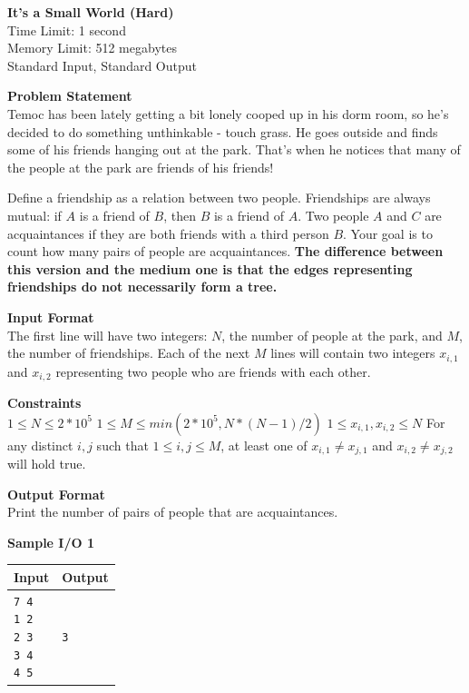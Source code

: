 \documentclass{article}
\begin{document}
\begin{center}
{\LARGE \bf It's a Small World (Hard)}\\
{\large Time Limit: 1 second}\\
{\large Memory Limit: 512 megabytes}\\
Standard Input, Standard Output
\end{center}

{\noindent \bf Problem Statement}\\
Temoc has been lately getting a bit lonely cooped up in his dorm room, so he's decided to do something unthinkable - touch grass. He goes outside and finds some of his friends hanging out at the park. That's when he notices that many of the people at the park are friends of his friends! \newline

\noindent Define a friendship as a relation between two people. Friendships are always mutual: if $A$ is a friend of $B$, then $B$ is a friend of $A$. Two people $A$ and $C$ are acquaintances if they are both friends with a third person $B$. Your goal is to count how many pairs of people are acquaintances. \textbf{The difference between this version and the medium one is that the edges representing friendships do not necessarily form a tree.} \newline

{\noindent \bf Input Format}\\
The first line will have two integers: $N$, the number of people at the park, and $M$, the number of friendships. Each of the next $M$ lines will contain two integers $x_{i,1}$ and $x_{i,2}$ representing two people who are friends with each other. \newline

{\noindent \bf Constraints}\\
$1 \leq N \leq 2 * 10^5$ \newline
$1 \leq M \leq min(2*10^5, N*(N - 1)/2)$ \newline
$1 \leq x_{i,1},x_{i,2} \leq N$ \newline
For any distinct $i,j$ such that $1 \leq i,j \leq M$, at least one of $x_{i,1} \neq x_{j,1}$ and $x_{i,2} \neq x_{j,2}$ will hold true. \newline

{\noindent \bf Output Format}\\
Print the number of pairs of people that are acquaintances. \newline

{\noindent \bf Sample I/O 1}\\
\begin{tabular}{|p{}|p{}|}
    \hline
    \textbf{Input} & \textbf{Output}\\
    \hline
    \texttt{7 4 \newline 1 2 \newline 2 3 \newline 3 4 \newline 4 5}
    &
    \texttt{3}\\
    \hline
\end{tabular} \newline \newline
\end{document}

